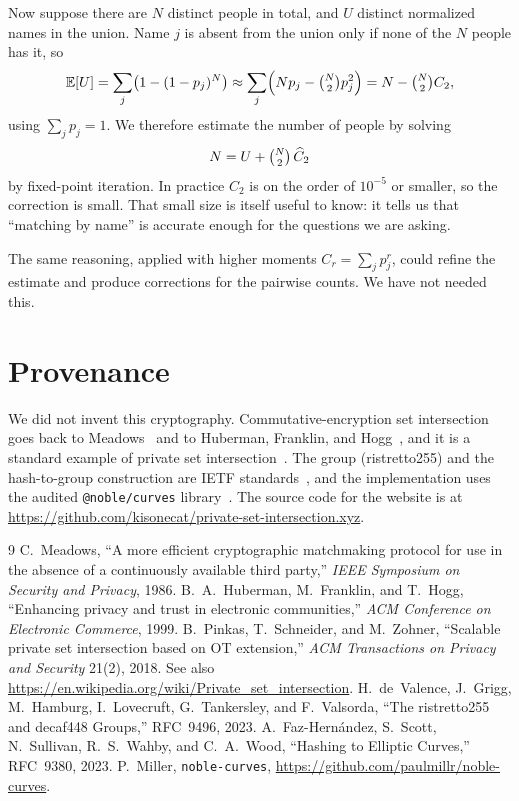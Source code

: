 \documentclass[11pt]{article}
\begin{document}
Now suppose there are $N$ distinct people in total, and $U$ distinct normalized names in the
union. Name $j$ is absent from the union only if none of the $N$ people has it, so
\[
  \mathbb{E}[U] = \sum_j \bigl(1 - (1-p_j)^N\bigr)
  \approx \sum_j \Bigl(N p_j - \tbinom{N}{2} p_j^2\Bigr)
  = N - \tbinom{N}{2} C_2 ,
\]
using $\sum_j p_j = 1$. We therefore estimate the number of people by solving
\[
  N = U + \tbinom{N}{2}\,\widehat{C}_2
\]
by fixed-point iteration. In practice $C_2$ is on the order of $10^{-5}$ or smaller, so the
correction is small. That small size is itself useful to know: it tells us that ``matching by
name'' is accurate enough for the questions we are asking.

The same reasoning, applied with higher moments $C_r = \sum_j p_j^r$, could refine the estimate
and produce corrections for the pairwise counts. We have not needed this.

\section{Provenance}\label{sec:provenance}

We did not invent this cryptography. Commutative-encryption set intersection goes back to
Meadows~\cite{meadows} and to Huberman, Franklin, and Hogg~\cite{hfh}, and it is a standard
example of private set intersection~\cite{psi-survey}. The group (ristretto255) and the hash-to-group
construction are IETF standards~\cite{rfc9496,rfc9380}, and the implementation uses the audited
\texttt{@noble/curves} library~\cite{noble}. The source code for the website is at
\url{https://github.com/kisonecat/private-set-intersection.xyz}.

\begin{thebibliography}{9}
  C.~Meadows, ``A more efficient cryptographic matchmaking protocol for use in the absence of a
  continuously available third party,'' \emph{IEEE Symposium on Security and Privacy}, 1986.
  B.~A.~Huberman, M.~Franklin, and T.~Hogg, ``Enhancing privacy and trust in electronic
  communities,'' \emph{ACM Conference on Electronic Commerce}, 1999.
  B.~Pinkas, T.~Schneider, and M.~Zohner, ``Scalable private set intersection based on OT
  extension,'' \emph{ACM Transactions on Privacy and Security} 21(2), 2018. See also
  \url{https://en.wikipedia.org/wiki/Private_set_intersection}.
  H.~de~Valence, J.~Grigg, M.~Hamburg, I.~Lovecruft, G.~Tankersley, and F.~Valsorda,
  ``The ristretto255 and decaf448 Groups,'' RFC~9496, 2023.
  A.~Faz-Hern\'andez, S.~Scott, N.~Sullivan, R.~S.~Wahby, and C.~A.~Wood,
  ``Hashing to Elliptic Curves,'' RFC~9380, 2023.
  P.~Miller, \texttt{noble-curves}, \url{https://github.com/paulmillr/noble-curves}.
\end{thebibliography}
\end{document}
